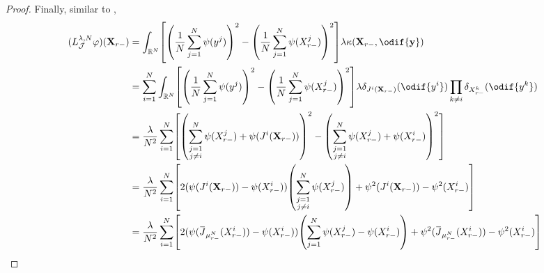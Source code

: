 \begin{proof}
  Finally, similar to ,
  \begin{equation}
    \begin{split}
      (L_{\cJ}^{\lambda, N} \varphi) (\bm{X}_{r-})
       & = \int_{\potspace^N} \sbr*{ \br*{ \frac{1}{N} \sum_{j=1}^N \psi(y^j) }^2 - \br*{ \frac{1}{N} \sum_{j=1}^N \psi(X_{r-}^j) }^2 } \lambda \kappa(\bm{X}_{r-},\odif{\bm{y}})                                                                   \\
       & = \sum_{i=1}^N \int_{\potspace^N} \sbr*{ \br*{ \frac{1}{N} \sum_{j=1}^N \psi(y^j) }^2 - \br*{ \frac{1}{N} \sum_{j=1}^N \psi(X_{r-}^j) }^2 } \lambda \delta_{\jtarg^i(\bm{X}_{r-})}(\odif{y^i}) \prod_{k \neq i} \delta_{X_{r-}^k}(\odif{y^k}) \\
       & = \frac{\lambda}{N^2} \sum_{i=1}^N \sbr*{ \br*{  \sum_{\substack{j=1                                                                                                                                                                 \\ j \neq i}}^N \psi(X_{r-}^j) + \psi(\jtarg^i(\bm{X}_{r-})) }^2 - \br*{ \sum_{\substack{j=1 \\ j \neq i}}^N \psi(X_{r-}^j) + \psi(X_{r-}^i) }^2 }  \\
       & = \frac{\lambda}{N^2} \sum_{i=1}^N \sbr*{ 2 (\psi(\jtarg^i(\bm{X}_{r-})) - \psi(X_{r-}^i)) \br*{\sum_{\substack{j=1                                                                                                                        \\ j \neq i}}^N \psi(X_{r-}^j)} + \psi^2(\jtarg^i(\bm{X}_{r-})) - \psi^2(X_{r-}^i) } \\
       & = \frac{\lambda}{N^2} \sum_{i=1}^N \sbr*{ 2 (\psi(\ol{\jtarg}_{\mu_{r-}^N}(X_{r-}^i)) - \psi(X_{r-}^i)) \br*{\sum_{j=1}^N \psi(X_{r-}^j) - \psi(X_{r-}^i)} + \psi^2(\ol{\jtarg}_{\mu_{r-}^N}(X_{r-}^i)) - \psi^2(X_{r-}^i) }                                 \\

\end{split}
\end{equation}
\end{proof}
